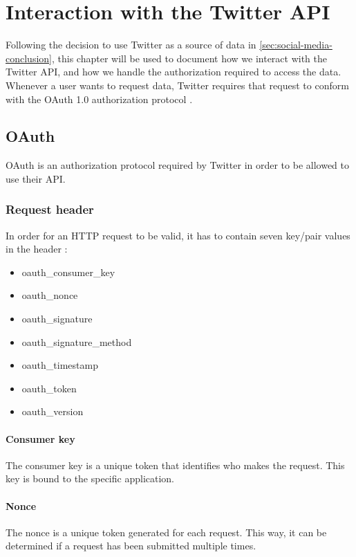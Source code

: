 \chapter{Interaction with the Twitter \ac{API}}\label{cha:twitterAPI}
Following the decision to use Twitter as a source of data in
\autoref{sec:social-media-conclusion}, this chapter will be used to document how we interact
with the Twitter API, and how we handle the authorization required to access the
data. Whenever a user wants to request data, Twitter requires that request to
conform with the OAuth 1.0 authorization protocol \citep{OAuth1}.

\section{OAuth}
OAuth is an authorization protocol required by Twitter in order to be allowed to
use their \ac{API}.

\subsection{Request header}
In order for an \ac{HTTP} request to be valid, it has to
contain seven key/pair values in the header \citep{TwitterAPIAuth}:
\begin{itemize}
  \item oauth\_consumer\_key
  \item oauth\_nonce
  \item oauth\_signature
  \item oauth\_signature\_method
  \item oauth\_timestamp
  \item oauth\_token
  \item oauth\_version
\end{itemize}

\subsubsection*{Consumer key}
The consumer key is a unique token that identifies who makes the request.
This key is bound to the specific application.

\subsubsection*{Nonce}
The nonce is a unique token generated for each request. This way, it can be
determined if a request has been submitted multiple times. 

